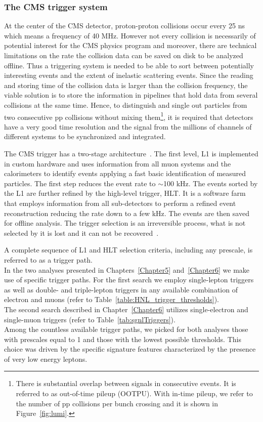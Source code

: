 \clearpage
\subsubsection{The CMS trigger system}\label{sec:triggersystem}

At the center of the CMS detector, proton-proton collisions occur every
25 ns which means a frequency of 40 MHz. However not every collision is
necessarily of potential interest for the CMS physics program and
moreover, there are technical limitations on the rate the collision data can be
saved on disk to be analyzed offline. Thus a triggering system is needed to be
able to sort between potentially interesting events and the extent of
inelastic scattering events.
Since the reading and storing time of the collision data is larger
than the collision frequency, the viable solution is
to store the information in pipelines that hold data
from several collisions at the same time.
Hence, to distinguish and single out particles from two consecutive pp collisions without
mixing them\footnote{There is substantial
overlap between signals in consecutive events. It is referred to as
out-of-time pileup (OOTPU). With in-time pileup, we refer to the number of
pp collisions per bunch crossing and it is shown in
Figure~\ref{fig:lumi}.}, it is
required that detectors have a very good time
resolution and the signal from the millions of channels of different
systems to be synchronized and integrated.

The CMS trigger has a two-stage architecture~\cite{Khachatryan_2017}. The first level, L1 is
implemented in custom hardware and uses information from 
all muon systems and the calorimeters to identify events applying a fast
basic identification of measured particles. The first step reduces the
event rate to $\sim$100 kHz. The events sorted by the L1 are further refined by the
high-level trigger, HLT. It is a software farm that employs information from all sub-detectors to perform a
refined event reconstruction reducing the rate down to a few kHz. The 
events are then saved for offline analysis.
The trigger selection is an irreversible process, what is not selected
by it is lost and it can not be recovered~\cite{Khachatryan_2017}.

A complete sequence of L1
and HLT selection criteria, including any prescale, is referred to
as a trigger path.\\

In the two analyses presented in Chapters~\ref{Chapter5}
and~\ref{Chapter6} we make use of specific trigger paths. For the
first search we employ single-lepton triggers as well as double- and
triple-lepton triggers in any available combination of electron and
muons (refer to Table~\ref{table:HNL_trigger_thresholds}).\\
The second search described in Chapter~\ref{Chapter6} utilizes
single-electron and single-muon triggers (refer to
Table~\ref{tab:sgnlTriggers}).\\
Among the countless available trigger paths, we picked for both
analyses those with prescales equal to 1 and those with the
lowest possible \pt thresholds. This choice was driven by the specific
signature features characterized by the presence of very low energy leptons.

